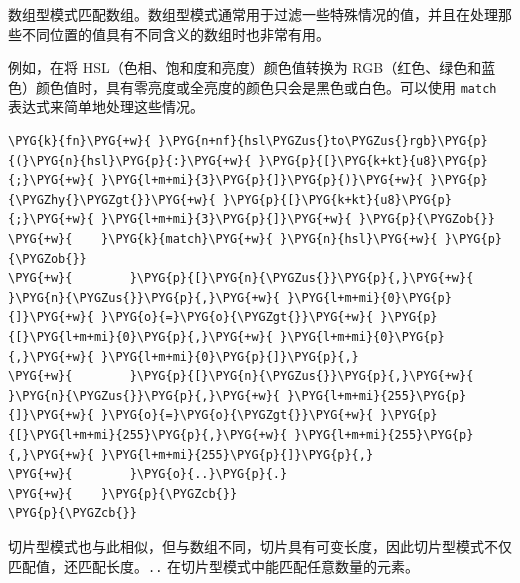数组型模式匹配数组。数组型模式通常用于过滤一些特殊情况的值，并且在处理那些不同位置的值具有不同含义的数组时也非常有用。

例如，在将 HSL（色相、饱和度和亮度）颜色值转换为 RGB（红色、绿色和蓝色）颜色值时，具有零亮度或全亮度的颜色只会是黑色或白色。可以使用 \texttt{match} 表达式来简单地处理这些情况。

\begin{Verbatim}[commandchars=\\\{\},breaklines=true,breakanywhere=true,fontsize=\codefont,xleftmargin=17bp]
\PYG{k}{fn}\PYG{+w}{ }\PYG{n+nf}{hsl\PYGZus{}to\PYGZus{}rgb}\PYG{p}{(}\PYG{n}{hsl}\PYG{p}{:}\PYG{+w}{ }\PYG{p}{[}\PYG{k+kt}{u8}\PYG{p}{;}\PYG{+w}{ }\PYG{l+m+mi}{3}\PYG{p}{]}\PYG{p}{)}\PYG{+w}{ }\PYG{p}{\PYGZhy{}\PYGZgt{}}\PYG{+w}{ }\PYG{p}{[}\PYG{k+kt}{u8}\PYG{p}{;}\PYG{+w}{ }\PYG{l+m+mi}{3}\PYG{p}{]}\PYG{+w}{ }\PYG{p}{\PYGZob{}}
\PYG{+w}{    }\PYG{k}{match}\PYG{+w}{ }\PYG{n}{hsl}\PYG{+w}{ }\PYG{p}{\PYGZob{}}
\PYG{+w}{        }\PYG{p}{[}\PYG{n}{\PYGZus{}}\PYG{p}{,}\PYG{+w}{ }\PYG{n}{\PYGZus{}}\PYG{p}{,}\PYG{+w}{ }\PYG{l+m+mi}{0}\PYG{p}{]}\PYG{+w}{ }\PYG{o}{=}\PYG{o}{\PYGZgt{}}\PYG{+w}{ }\PYG{p}{[}\PYG{l+m+mi}{0}\PYG{p}{,}\PYG{+w}{ }\PYG{l+m+mi}{0}\PYG{p}{,}\PYG{+w}{ }\PYG{l+m+mi}{0}\PYG{p}{]}\PYG{p}{,}
\PYG{+w}{        }\PYG{p}{[}\PYG{n}{\PYGZus{}}\PYG{p}{,}\PYG{+w}{ }\PYG{n}{\PYGZus{}}\PYG{p}{,}\PYG{+w}{ }\PYG{l+m+mi}{255}\PYG{p}{]}\PYG{+w}{ }\PYG{o}{=}\PYG{o}{\PYGZgt{}}\PYG{+w}{ }\PYG{p}{[}\PYG{l+m+mi}{255}\PYG{p}{,}\PYG{+w}{ }\PYG{l+m+mi}{255}\PYG{p}{,}\PYG{+w}{ }\PYG{l+m+mi}{255}\PYG{p}{]}\PYG{p}{,}
\PYG{+w}{        }\PYG{o}{..}\PYG{p}{.}
\PYG{+w}{    }\PYG{p}{\PYGZcb{}}
\PYG{p}{\PYGZcb{}}
\end{Verbatim}

切片型模式也与此相似，但与数组不同，切片具有可变长度，因此切片型模式不仅匹配值，还匹配长度。\texttt{..} 在切片型模式中能匹配任意数量的元素。

